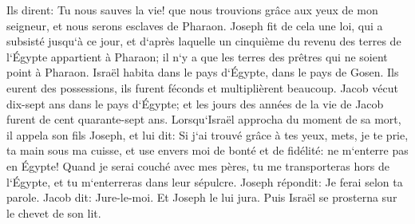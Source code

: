 \verse Ils dirent: Tu nous sauves la vie! que nous trouvions grâce aux yeux de mon seigneur, et nous serons esclaves de Pharaon. 
\verse Joseph fit de cela une loi, qui a subsisté jusqu`à ce jour, et d`après laquelle un cinquième du revenu des terres de l`Égypte appartient à Pharaon; il n`y a que les terres des prêtres qui ne soient point à Pharaon. 
\verse Israël habita dans le pays d`Égypte, dans le pays de Gosen. Ils eurent des possessions, ils furent féconds et multiplièrent beaucoup. 
\verse Jacob vécut dix-sept ans dans le pays d`Égypte; et les jours des années de la vie de Jacob furent de cent quarante-sept ans. 
\verse Lorsqu`Israël approcha du moment de sa mort, il appela son fils Joseph, et lui dit: Si j`ai trouvé grâce à tes yeux, mets, je te prie, ta main sous ma cuisse, et use envers moi de bonté et de fidélité: ne m`enterre pas en Égypte! 
\verse Quand je serai couché avec mes pères, tu me transporteras hors de l`Égypte, et tu m`enterreras dans leur sépulcre. Joseph répondit: Je ferai selon ta parole. 
\verse Jacob dit: Jure-le-moi. Et Joseph le lui jura. Puis Israël se prosterna sur le chevet de son lit. 


